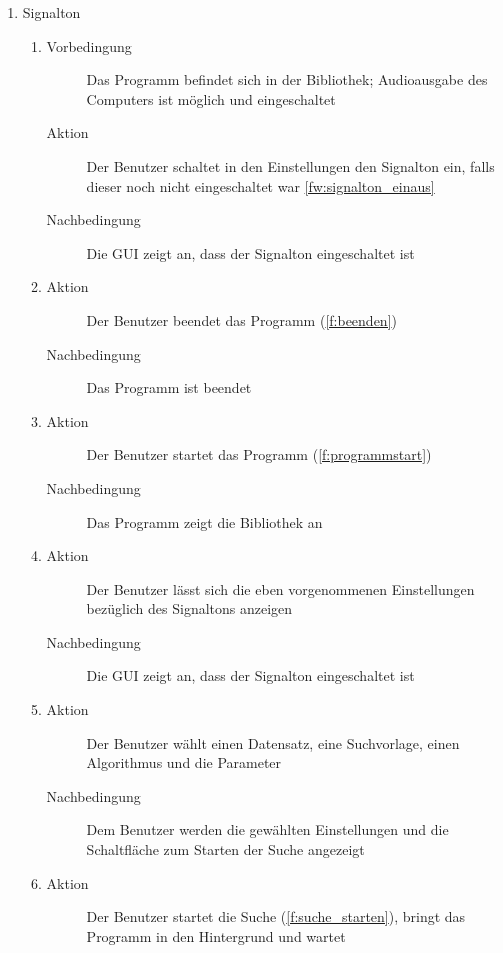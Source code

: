 \begin{enumerate} [label=\bfseries /TSW \arabic*0/, leftmargin=*]
	\item Signalton \label{ts:signalton}
	\begin{enumerate}[leftmargin=0pt]
		\item
		\begin{description}
			\item[Vorbedingung] Das Programm befindet sich in der Bibliothek; Audioausgabe des Computers ist möglich und eingeschaltet
			\item[Aktion] Der Benutzer schaltet in den Einstellungen den Signalton ein, falls dieser noch nicht eingeschaltet war \ref{fw:signalton_einaus}
			\item[Nachbedingung] Die \gls{GUI} zeigt an, dass der Signalton eingeschaltet ist
		\end{description}
		\item
		\begin{description}
			\item[Aktion] Der Benutzer beendet das Programm (\ref{f:beenden})
			\item[Nachbedingung] Das Programm ist beendet
		\end{description}
		\item
		\begin{description}
			\item[Aktion] Der Benutzer startet das Programm (\ref{f:programmstart})
			\item[Nachbedingung] Das Programm zeigt die Bibliothek an
		\end{description}
		\item
		\begin{description}
			\item[Aktion] Der Benutzer lässt sich die eben vorgenommenen Einstellungen bezüglich des Signaltons anzeigen
			\item[Nachbedingung] Die \gls{GUI} zeigt an, dass der Signalton eingeschaltet ist
		\end{description}
		\item
		\begin{description}
			\item[Aktion] Der Benutzer wählt einen Datensatz, eine Suchvorlage, einen Algorithmus und die Parameter
			\item[Nachbedingung] Dem Benutzer werden die gewählten Einstellungen und die Schaltfläche zum Starten der Suche angezeigt
		\end{description}
		\item
		\begin{description}
			\item[Aktion] Der Benutzer startet die Suche (\ref{f:suche_starten}), bringt das Programm in den Hintergrund und wartet

\end{description}
\end{enumerate}
\end{enumerate}
